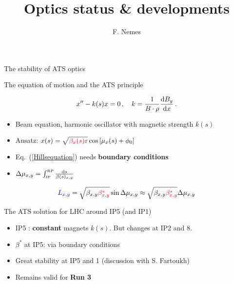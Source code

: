 \documentclass{beamer}
\title[TOTEM Collaboration Meeting]{\large Optics status \& developments}\vspace{10mm}
\subtitle{\tiny }
\author{F. Nemes}
\begin{document}
\begin{frame}
	\titlepage
\end{frame}

\begin{frame}\scriptsize
	\Large
	\begin{center}
		The stability of ATS optics
	\end{center}
\end{frame}

\begin{frame}\scriptsize
	\begin{block}{The equation of motion and the ATS principle}\scriptsize

		\begin{equation}
		    x^{\prime\prime}-k(s)x=0\,,\,\,\,\,\,\,k = \frac{1}{B\cdot\rho} \frac{{\rm d} B_{y}}{{\rm d}x}\,.
		\label{Hillsequation}
		\end{equation}
		\begin{itemize}
			\item Beam equation, harmonic oscillator with magnetic strength $k(s)$
			\item Ansatz: $x(s)=\sqrt{{\color{red}\beta_x(s)}\varepsilon}\cos\left[\mu_x(s)+\phi_0\right]$
			\item Eq.~(\ref{Hillsequation}) needs {\bf boundary conditions}
			\item $\Delta\mu_{x,y}=\int^{\text{\tiny RP}}_{\text{\tiny IP}}\frac{{\rm d}s}{\beta(s)_{x,y}}$
		\end{itemize}\vspace{2mm}
	\begin{equation}\scriptsize
	    {\color{blue}L_{x,y}}=\sqrt{\beta_{x,y}{\color{red}\beta_{x,y}^{*}}}\sin\Delta\mu_{x,y}\approx\sqrt{\beta_{x,y}{\color{red}\beta_{x,y}^{*}}}\Delta\mu_{x,y}
	    \label{eq:deltaphi}
        \end{equation}
	
		
	\end{block}
	
	\begin{block}{The ATS solution for LHC around IP5 (and IP1)}
	

		\begin{itemize}
			\item IP5 : {\bf constant} magnets $k(s)$. But changes at IP2 and 8.
			\item $\beta^{*}$ at IP5: via boundary conditions 
			\item Great stability at IP5 and 1 (discussion with S. Fartoukh)
			\item Remains valid for {\color{red}\bf Run 3}
		\end{itemize}

	\end{block}
\end{frame}
\end{document}
